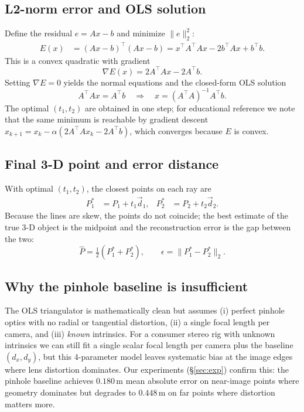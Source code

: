 \documentclass[11pt]{article}
\begin{document}
\subsection{L2-norm error and OLS solution}

Define the residual $e = Ax - b$ and minimize $\|e\|_2^2$:
\begin{align*}
E(x) &= (Ax-b)^\top (Ax-b) = x^\top A^\top A x - 2 b^\top A x + b^\top b.
\end{align*}
This is a convex quadratic with gradient
\[
\nabla E(x) = 2 A^\top A x - 2 A^\top b.
\]
Setting $\nabla E = 0$ yields the normal equations and the closed-form OLS solution
\begin{equation}
A^\top A x = A^\top b \quad\Longrightarrow\quad x = (A^\top A)^{-1} A^\top b.
\label{eq:ols}
\end{equation}
The optimal $(t_1, t_2)$ are obtained in one step; for educational reference we note that
the same minimum is reachable by gradient descent $x_{k+1} = x_k - \alpha (2 A^\top A x_k -
2 A^\top b)$, which converges because $E$ is convex.

\subsection{Final 3-D point and error distance}

With optimal $(t_1, t_2)$, the closest points on each ray are
\begin{align*}
P_1^\ast &= P_1 + t_1 \vec d_1, &
P_2^\ast &= P_2 + t_2 \vec d_2.
\end{align*}
Because the lines are skew, the points do not coincide; the best estimate of the true 3-D
object is the midpoint and the reconstruction error is the gap between the two:
\[
\hat P = \tfrac{1}{2}(P_1^\ast + P_2^\ast), \qquad
\epsilon = \|P_1^\ast - P_2^\ast\|_2.
\]

\subsection{Why the pinhole baseline is insufficient}

The OLS triangulator is mathematically clean but assumes (i) perfect pinhole optics with
no radial or tangential distortion, (ii) a single focal length per camera, and (iii)
\emph{known} intrinsics. For a consumer stereo rig with unknown intrinsics we can still
fit a single scalar focal length per camera plus the baseline $(d_x, d_y)$, but this
4-parameter model leaves systematic bias at the image edges where lens distortion
dominates. Our experiments (\S\ref{sec:exp}) confirm this: the pinhole baseline achieves
$0.180$\,m mean absolute error on near-image points where geometry dominates but degrades
to $0.448$\,m on far points where distortion matters more.
\end{document}
